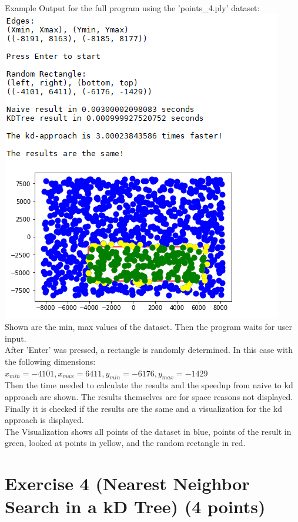 \documentclass[english, fontsize=12pt, paper=a4, twoside=false, draft=true, pagesize=auto, version=last, DIV=16]{scrartcl}
\theoremstyle{break}
\begin{document}
Example Output for the full program using the 'points\_4.ply' dataset:\\
\includegraphics{./images/task3.png}\\
Shown are the min, max values of the dataset. Then the program waits for user input.\\
After 'Enter' was pressed, a rectangle is randomly determined. In this case with the following dimensions:\\
$x_{min}=-4101, x_{max}=6411, y_{min}=-6176, y_{max}=-1429$\\
Then the time needed to calculate the results and the speedup from naive to kd approach are shown. The results themselves are for space reasons not displayed.\\
Finally it is checked if the results are the same and a visualization for the kd approach is displayed.\\
The Visualization shows all points of the dataset in blue, points of the result in green, looked at points in yellow, and the random rectangle in red.


\newpage

\section*{\large Exercise 4 (Nearest Neighbor Search in a kD Tree) {\normalsize \hfill (4 points)}}
\end{document}
